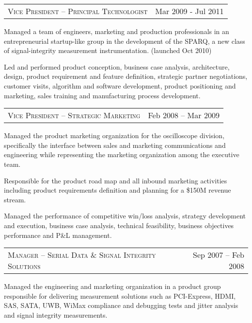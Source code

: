 \documentclass[10pt,letterpaper]{extarticle}
\makeatletter
\newcommand{\headerrow}[2]
{\begin{tabular*}{\linewidth}{l@{\extracolsep{\fill}}r}
	#1 &
	#2 \\
\end{tabular*}}
\makeatother
\begin{document}
	\headerrow
	{\large \textsc{Vice President – Principal Technologist}}
	{Mar 2009 - Jul 2011}\vspace{-\topsep}\begin{itemize*}
		\item Managed a team of engineers, marketing and production professionals in an
		entrepreneurial startup-like group in the development of the SPARQ, a new class of 
		signal-integrity measurement instrumentation. (launched Oct 2010)
		\item Led and performed product conception, business case analysis, architecture,
		design, product requirement and feature definition, strategic partner negotiations, 
		customer visits, algorithm and software development, product positioning and 
		marketing, sales training and manufacturing process development. 
	\end{itemize*}\vspace{-\topsep}
	\headerrow
	{\large \textsc{Vice President – Strategic Marketing}}
	{Feb 2008 – Mar 2009}\vspace{-\topsep}\begin{itemize*}
		\item Managed the product marketing organization for the oscilloscope division, 
		specifically the interface between sales and marketing communications and engineering 
		while representing the marketing organization among the executive team.
		\item Responsible for the product road map and all inbound marketing activities 
		including product requirements definition and planning for a \$150M revenue stream.
		\item Managed the performance of competitive win/loss analysis, strategy development 
		and execution, business case analysis, technical feasibility, business objectives 
		performance and P\&L management.
	\end{itemize*}\vspace{-\topsep}
	\headerrow
	{\large \textsc{Manager – Serial Data \& Signal Integrity Solutions}}
	{Sep 2007 – Feb 2008}\vspace{-\topsep}\begin{itemize*}
	\item Managed the engineering and marketing organization in a product group responsible 
	for delivering measurement solutions such as PCI-Express, HDMI, SAS, SATA, UWB, WiMax 
	compliance and debugging tests and jitter analysis and signal integrity measurements.
	\end{itemize*}\vspace{-\topsep}
\end{document}
